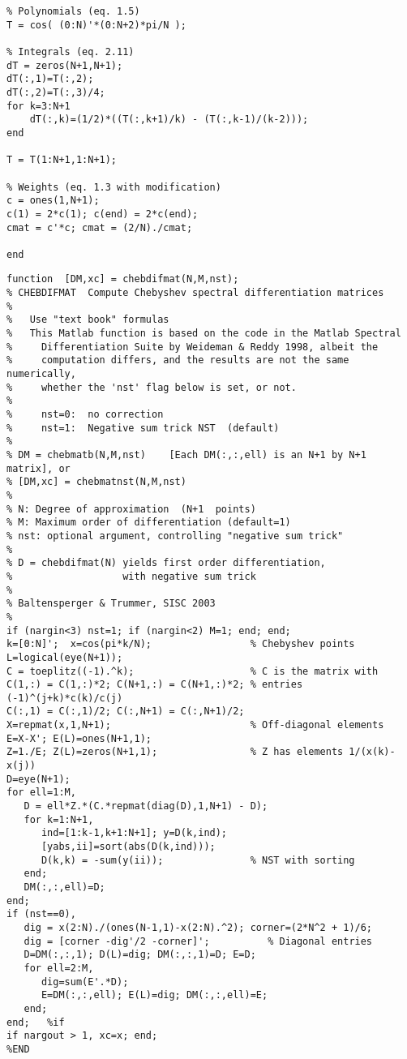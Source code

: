 \documentclass{sfuthesis}
\begin{document}
\begin{appendices}
\begin{verbatim}
% Polynomials (eq. 1.5)
T = cos( (0:N)'*(0:N+2)*pi/N );

% Integrals (eq. 2.11)
dT = zeros(N+1,N+1);
dT(:,1)=T(:,2);
dT(:,2)=T(:,3)/4;
for k=3:N+1
    dT(:,k)=(1/2)*((T(:,k+1)/k) - (T(:,k-1)/(k-2)));
end

T = T(1:N+1,1:N+1);

% Weights (eq. 1.3 with modification)
c = ones(1,N+1);
c(1) = 2*c(1); c(end) = 2*c(end);
cmat = c'*c; cmat = (2/N)./cmat;

end
\end{verbatim}

\newpage

\begin{verbatim}
function  [DM,xc] = chebdifmat(N,M,nst);
% CHEBDIFMAT  Compute Chebyshev spectral differentiation matrices
%
%   Use "text book" formulas 
%   This Matlab function is based on the code in the Matlab Spectral
%     Differentiation Suite by Weideman & Reddy 1998, albeit the
%     computation differs, and the results are not the same numerically, 
%     whether the 'nst' flag below is set, or not.
%      
%     nst=0:  no correction
%     nst=1:  Negative sum trick NST  (default)
%
% DM = chebmatb(N,M,nst)    [Each DM(:,:,ell) is an N+1 by N+1 matrix], or
% [DM,xc] = chebmatnst(N,M,nst)
%
% N: Degree of approximation  (N+1  points)
% M: Maximum order of differentiation (default=1)
% nst: optional argument, controlling "negative sum trick"
%
% D = chebdifmat(N) yields first order differentiation, 
%                   with negative sum trick
%
% Baltensperger & Trummer, SISC 2003
%
if (nargin<3) nst=1; if (nargin<2) M=1; end; end;
k=[0:N]';  x=cos(pi*k/N);                 % Chebyshev points
L=logical(eye(N+1));
C = toeplitz((-1).^k);                    % C is the matrix with 
C(1,:) = C(1,:)*2; C(N+1,:) = C(N+1,:)*2; % entries (-1)^(j+k)*c(k)/c(j)
C(:,1) = C(:,1)/2; C(:,N+1) = C(:,N+1)/2;
X=repmat(x,1,N+1);                        % Off-diagonal elements
E=X-X'; E(L)=ones(N+1,1); 
Z=1./E; Z(L)=zeros(N+1,1);                % Z has elements 1/(x(k)-x(j)) 
D=eye(N+1);
for ell=1:M,
   D = ell*Z.*(C.*repmat(diag(D),1,N+1) - D);
   for k=1:N+1,
      ind=[1:k-1,k+1:N+1]; y=D(k,ind);
      [yabs,ii]=sort(abs(D(k,ind)));
      D(k,k) = -sum(y(ii));               % NST with sorting
   end;
   DM(:,:,ell)=D;
end;
if (nst==0),
   dig = x(2:N)./(ones(N-1,1)-x(2:N).^2); corner=(2*N^2 + 1)/6;
   dig = [corner -dig'/2 -corner]';          % Diagonal entries
   D=DM(:,:,1); D(L)=dig; DM(:,:,1)=D; E=D;
   for ell=2:M,
      dig=sum(E'.*D);  
      E=DM(:,:,ell); E(L)=dig; DM(:,:,ell)=E;
   end;
end;   %if
if nargout > 1, xc=x; end;
%END
\end{verbatim}


\end{appendices}
\end{document}
